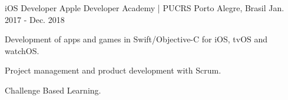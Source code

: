 \begin{cventries}
  \cventry
    {iOS Developer}
    {Apple Developer Academy | PUCRS}
    {Porto Alegre, Brasil}
    {Jan. 2017 - Dec. 2018}
    {
      \begin{cvitems}
        \item {Development of apps and games in Swift/Objective-C for iOS, tvOS and watchOS.}
        \item {Project management and product development with Scrum.}
        \item {Challenge Based Learning.}
      \end{cvitems}
    }
\end{cventries}
